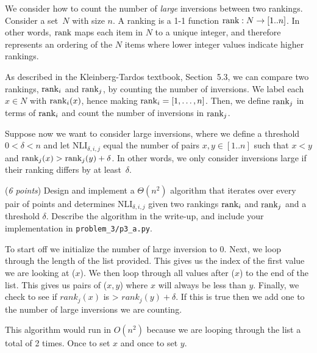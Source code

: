 \documentclass{hw}
\begin{document}
\newcommand{\rank}{\textnormal{rank}}
\newcommand{\Colon}{:}
\newcommand{\dotdot}{..}
\newcommand{\numinv}{\textrm{NI}}
\newcommand{\numlargeinv}{\textrm{NLI}}

\begin{problem}
    We consider how to count the number of \emph{large} inversions between two rankings. Consider a set~$N$ with size $n$. 
    A ranking is a 1-1 function $\rank\Colon N \rightarrow [1\dotdot n]$. In other words, $\rank$ maps each item in $N$ to a unique integer, and therefore represents an ordering of the $N$ items where lower integer values indicate higher rankings. 
    
    As described in the Kleinberg-Tardos textbook, Section~5.3, we can compare two rankings, $\rank_i$ and $\rank_j$, by counting the number of inversions. We label each $x \in N$ with $\rank_i(x)$, hence making $\rank_i = [1, \dots ,n]$. Then, we define $\rank_j$ in terms of $\rank_i$ and count the number of inversions in $\rank_j$. 
    
    Suppose now we want to consider large inversions, where we define a threshold $0 < \delta < n$ and let $\numlargeinv_{\delta,i,j}$ equal the number of pairs $x,y \in [1\dotdot n]$ such that $x < y$ and $\rank_j(x) > \rank_j(y) + \delta$. In other words, we only consider inversions large if their ranking differs by at least~$\delta$.
        \begin{subproblem}
            (\textit{6 points})
            Design and implement a $\Theta(n^2)$ algorithm that iterates over every pair of points and determines $\numlargeinv_{\delta,i,j}$ given two rankings $\rank_i$ and $\rank_j$ and a threshold $\delta$. Describe the algorithm in the write-up, and include your implementation in \texttt{problem\_3/p3\_a.py}.
        \end{subproblem}

        \begin{solution}
            To start off we initialize the number of large inversion to 0. Next, we loop through the length of the list provided. This gives us the index of the first value we are looking at ($x$). We then loop through all values after ($x$) to the end of the list. This gives us pairs of ($x,y$) where $x$ will always be less than $y$. Finally, we check to see if $rank_j(x)$ is > $rank_j(y) + \delta$. If this is true then we add one to the number of large inversions we are counting.
            
            This algorithm would run in $O(n^2)$ because we are looping through the list a total of 2 times. Once to set $x$ and once to set $y$.
        \end{solution}


\end{problem}
\end{document}
